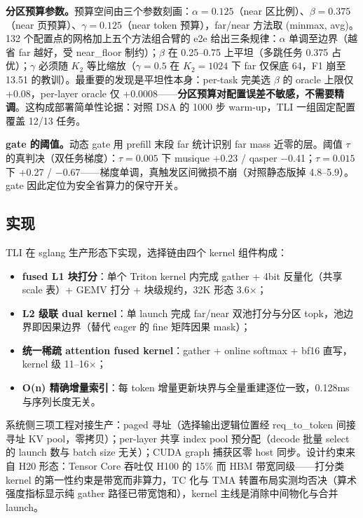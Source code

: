 \documentclass[11pt]{article}
\begin{document}
\textbf{分区预算参数。}预算空间由三个参数刻画：$\alpha{=}0.125$（near 区比例）、$\beta{=}0.375$（near 页预算）、$\gamma{=}0.125$（near token 预算），far/near 方法取 (minmax, avg)。132 个配置点的网格加上五个方法组合臂的 e2e 给出三条规律：$\alpha$ 单调至边界（越省 far 越好，受 near\_floor 制约）；$\beta$ 在 0.25--0.75 上平坦（多跳任务 0.375 占优）；$\gamma$ 必须随 $K_2$ 等比缩放（$\gamma{=}0.5$ 在 $K_2{=}1024$ 下 far 仅保底 64，F1 崩至 13.51 的教训）。最重要的发现是平坦性本身：per-task 完美选 $\beta$ 的 oracle 上限仅 +0.08，per-layer oracle 仅 +0.0008——\textbf{分区预算对配置误差不敏感，不需要精调}。这构成部署简单性论据：对照 DSA 的 1000 步 warm-up，TLI 一组固定配置覆盖 12/13 任务。

\textbf{gate 的阈值。}动态 gate 用 prefill 末段 far 统计识别 far mass 近零的层。阈值 $\tau$ 的真判决（双任务梯度）：$\tau{=}0.005$ 下 musique +0.23 / qasper $-$0.41；$\tau{=}0.015$ 下 +0.27 / $-$0.67——梯度单调，真触发区间微损不崩（对照静态版掉 4.8--5.9）。gate 因此定位为安全省算力的保守开关。

\subsection{实现}

TLI 在 sglang 生产形态下实现，选择链由四个 kernel 组件构成：
\begin{itemize}
\item \textbf{fused L1 块打分}：单个 Triton kernel 内完成 gather + 4bit 反量化（共享 scale 表）+ GEMV 打分 + 块级规约，32K 形态 3.6$\times$；
\item \textbf{L2 级联 dual kernel}：单 launch 完成 far/near 双池打分与分区 topk，池边界即因果边界（替代 eager 的 fine 矩阵因果 mask）；
\item \textbf{统一稀疏 attention fused kernel}：gather + online softmax + bf16 直写，kernel 级 11--16$\times$；
\item \textbf{O(n) 精确增量索引}：每 token 增量更新块界与全量重建逐位一致，0.128ms 与序列长度无关。
\end{itemize}
系统侧三项工程对接生产：paged 寻址（选择输出逻辑位置经 req\_to\_token 间接寻址 KV pool，零拷贝）；per-layer 共享 index pool 预分配（decode 批量 select 的 launch 数与 batch size 无关）；CUDA graph 捕获区零 host 同步。设计约束来自 H20 形态：Tensor Core 吞吐仅 H100 的 15\% 而 HBM 带宽同级——打分类 kernel 的第一性约束是带宽而非算力，TC 化与 TMA 转置布局实测均否决（算术强度指标显示纯 gather 路径已带宽饱和），kernel 主线是消除中间物化与合并 launch。
\end{document}
